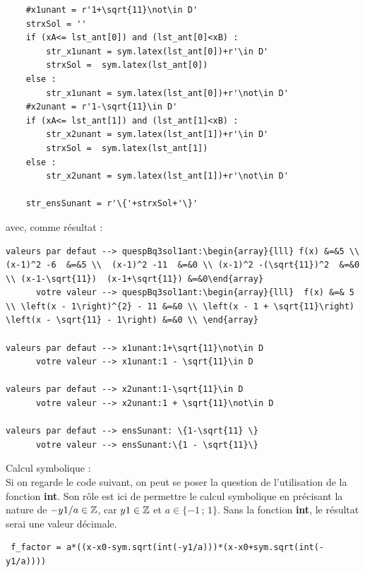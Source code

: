 {\begin{enumerate}
\begin{verbatim}
    #x1unant = r'1+\sqrt{11}\not\in D' 
    strxSol = ''
    if (xA<= lst_ant[0]) and (lst_ant[0]<xB) : 
        str_x1unant = sym.latex(lst_ant[0])+r'\in D'
        strxSol =  sym.latex(lst_ant[0])
    else :
        str_x1unant = sym.latex(lst_ant[0])+r'\not\in D'
    #x2unant = r'1-\sqrt{11}\in D' 
    if (xA<= lst_ant[1]) and (lst_ant[1]<xB) : 
        str_x2unant = sym.latex(lst_ant[1])+r'\in D'
        strxSol =  sym.latex(lst_ant[1])
    else :
        str_x2unant = sym.latex(lst_ant[1])+r'\not\in D'
    
    str_ensSunant = r'\{'+strxSol+'\}' 
\end{verbatim}
avec, comme résultat :
\begin{verbatim}
valeurs par defaut --> quespBq3sol1ant:\begin{array}{lll} f(x) &=&5 \\ (x-1)^2 -6  &=&5 \\  (x-1)^2 -11  &=&0 \\ (x-1)^2 -(\sqrt{11})^2  &=&0 \\ (x-1-\sqrt{11})  (x-1+\sqrt{11}) &=&0\end{array}
      votre valeur --> quespBq3sol1ant:\begin{array}{lll}  f(x) &=& 5 \\ \left(x - 1\right)^{2} - 11 &=&0 \\ \left(x - 1 + \sqrt{11}\right) \left(x - \sqrt{11} - 1\right) &=&0 \\ \end{array}

valeurs par defaut --> x1unant:1+\sqrt{11}\not\in D
      votre valeur --> x1unant:1 - \sqrt{11}\in D

valeurs par defaut --> x2unant:1-\sqrt{11}\in D
      votre valeur --> x2unant:1 + \sqrt{11}\not\in D

valeurs par defaut --> ensSunant: \{1-\sqrt{11} \}
      votre valeur --> ensSunant:\{1 - \sqrt{11}\}
\end{verbatim}


\end{enumerate}
\begin{remarque} Calcul symbolique : \\ 
Si on regarde le code suivant, on peut se poser la question de l'utilisation de la fonction {\bf int}. Son rôle est ici de permettre le calcul symbolique en précisant 
la nature de $-y1/a\in \mathbb{Z}$, car $y1\in \mathbb{Z}$ et $a\in\{-1\,;\,1\}$. Sans la fonction {\bf int}, le résultat serai une valeur décimale.  
\begin{verbatim}
 f_factor = a*((x-x0-sym.sqrt(int(-y1/a)))*(x-x0+sym.sqrt(int(-y1/a))))
\end{verbatim}
 

\end{remarque}}
